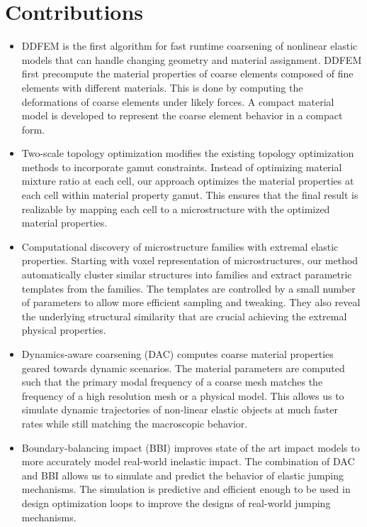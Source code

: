 \section{Contributions}
\begin{itemize}
	\item DDFEM is the first algorithm for fast runtime coarsening of nonlinear elastic models that can handle changing geometry and material assignment.
	DDFEM first precompute the material properties of coarse elements composed of fine elements with different materials.
	This is done by computing the deformations of coarse elements under likely forces.
	A compact material model is developed to represent the coarse element behavior in a compact form.
	\item Two-scale topology optimization modifies the existing topology optimization methods to incorporate gamut constraints.
	Instead of optimizing material mixture ratio at each cell, our approach optimizes the material properties at each cell within material property gamut.
	This ensures that the final result is realizable by mapping each cell to a microstructure with the optimized material properties.
	\item Computational discovery of microstructure families with extremal elastic properties. Starting with voxel representation of microstructures,
	our method automatically cluster similar structures into families and extract parametric templates from the families.
	The templates are controlled by a small number of parameters to allow more efficient sampling and tweaking.
	They also reveal the underlying structural similarity that are crucial achieving the extremal physical properties.	
	\item Dynamics-aware coarsening (DAC) computes coarse material properties geared towards dynamic scenarios.
	The material parameters are computed such that the primary modal frequency
	of a coarse mesh matches the frequency of a high resolution mesh or a physical model.
	This allows us to simulate dynamic trajectories of non-linear elastic objects at much faster rates while still matching the macroscopic behavior.
	\item Boundary-balancing impact (BBI) improves state of the art impact models to more accurately model real-world inelastic impact.
	The combination of DAC and BBI allows us to simulate and predict the behavior of elastic jumping mechanisms.
	The simulation is predictive and efficient enough to be used in design optimization loops to improve the designs of real-world jumping mechanisms.
\end{itemize}